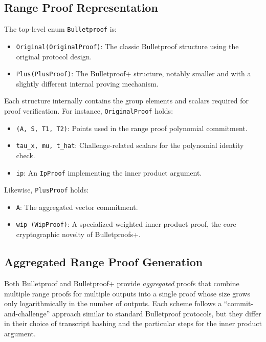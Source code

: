 \documentclass[12pt,a4paper]{article}
\begin{document}
\subsection{Range Proof Representation}
The top-level enum \texttt{Bulletproof} is:
\begin{itemize}
    \item \texttt{Original(OriginalProof)}: The classic Bulletproof structure using the original protocol design.
    \item \texttt{Plus(PlusProof)}: The Bulletproof+ structure, notably smaller and with a slightly different internal proving mechanism.
\end{itemize}

Each structure internally contains the group elements and scalars required for proof verification.  For instance, \texttt{OriginalProof} holds:
\begin{itemize}
    \item \texttt{(A, S, T1, T2)}: Points used in the range proof polynomial commitment.
    \item \texttt{tau\_x, mu, t\_hat}: Challenge-related scalars for the polynomial identity check.
    \item \texttt{ip}: An \texttt{IpProof} implementing the inner product argument.
\end{itemize}

Likewise, \texttt{PlusProof} holds:
\begin{itemize}
    \item \texttt{A}: The aggregated vector commitment.
    \item \texttt{wip (WipProof)}: A specialized weighted inner product proof, the core cryptographic novelty of Bulletproofs+.
\end{itemize}

\subsection{Aggregated Range Proof Generation}
Both Bulletproof and Bulletproof+ provide \emph{aggregated} proofs that combine multiple range proofs for multiple outputs into a single proof whose size grows only logarithmically in the number of outputs.  Each scheme follows a ``commit-and-challenge'' approach similar to standard Bulletproof protocols, but they differ in their choice of transcript hashing and the particular steps for the inner product argument.
\end{document}
